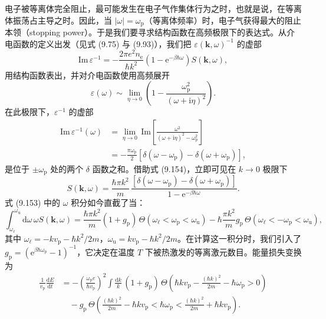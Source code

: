 电子被等离体完全阻止，最可能发生在电子气作集体行为之时，也就是说，在等离体振荡占主导之时。因此，当 $|\omega|=\omega_{\mathrm{p}}$（等离体频率）时，电子气获得最大的阻止本领（stopping power）。于是我们要寻求结构函数在高频极限下的表达式。从介电函数的定义出发（见式 (9.75) 与 (9.93)），我们把 $\varepsilon(\mathbf{k},\omega)^{-1}$ 的虚部
\begin{equation*}
\mathrm{Im}\,\varepsilon^{-1}=-\frac{2\pi e^{2}n_{\mathrm{e}}}{\hbar k^{2}}\left(1-\mathrm{e}^{-\beta\hbar\omega}\right)S(\mathbf{k},\omega),
\tag{9.154}
\end{equation*}
用结构函数表出，并对介电函数使用高频展开
\begin{equation*}
\varepsilon(\omega)\sim\lim_{\eta\to0}\left(1-\frac{\omega_{\mathrm{p}}^{2}}{(\omega+\mathrm{i}\eta)^{2}}\right).
\tag{9.155}
\end{equation*}
在此极限下，$\varepsilon^{-1}$ 的虚部
\begin{align*}
\mathrm{Im}\,\varepsilon^{-1}(\omega)&=\lim_{\eta\to0}\,\mathrm{Im}\left[\frac{\omega^{2}}{(\omega+\mathrm{i}\eta)^{2}-\omega_{\mathrm{p}}^{2}}\right]\\
&=-\frac{\pi\omega_{\mathrm{p}}}{2}\left[\delta(\omega-\omega_{\mathrm{p}})-\delta(\omega+\omega_{\mathrm{p}})\right],
\tag{9.156}
\end{align*}
是位于 $\pm\omega_{\mathrm{p}}$ 处的两个 $\delta$ 函数之和。借助式 (9.154)，立即可见在 $k\to0$ 极限下
\begin{equation*}
S(\mathbf{k},\omega)=\frac{\hbar\pi k^{2}}{m}\,\frac{\left[\delta(\omega-\omega_{\mathrm{p}})-\delta(\omega+\omega_{\mathrm{p}})\right]}{1-\mathrm{e}^{-\beta\hbar\omega}}.
\tag{9.157}
\end{equation*}
式 (9.153) 中的 $\omega$ 积分如今直截了当：
\begin{equation*}
\int_{\omega_{\ell}}^{\omega_{\mathrm{u}}}\mathrm{d}\omega\,\omega S(\mathbf{k},\omega)=\frac{\hbar\pi k^{2}}{m}(1+g_{\mathrm{p}})\,\Theta(\omega_{\ell}<\omega_{\mathrm{p}}<\omega_{\mathrm{u}})-\hbar\frac{\pi k^{2}}{m}g_{\mathrm{p}}\,\Theta(\omega_{\ell}<-\omega_{\mathrm{p}}<\omega_{\mathrm{u}}),
\tag{9.158}
\end{equation*}
其中 $\omega_{\ell}=-kv_{\mathrm{p}}-\hbar k^{2}/2m$，$\omega_{\mathrm{u}}=kv_{\mathrm{p}}-\hbar k^{2}/2m$。在计算这一积分时，我们引入了 $g_{\mathrm{p}}=(\mathrm{e}^{\beta\hbar\omega_{\mathrm{p}}}-1)^{-1}$，它决定在温度 $T$ 下被热激发的等离激元数目。能量损失变换为
\begin{align*}
\frac{1}{v_{\mathrm{p}}}\frac{\mathrm{d}E}{\mathrm{d}t}&=-\left(\frac{\omega_{\mathrm{p}}e}{\hbar v_{\mathrm{p}}}\right)^{2}\int\frac{\mathrm{d}k}{k}\,(1+g_{\mathrm{p}})\,\Theta\left(\hbar kv_{\mathrm{p}}-\frac{(\hbar k)^{2}}{2m}-\hbar\omega_{\mathrm{p}}>0\right)\\
&\quad-g_{\mathrm{p}}\,\Theta\left(\frac{(\hbar k)^{2}}{2m}-\hbar kv_{\mathrm{p}}<\hbar\omega_{\mathrm{p}}<\frac{(\hbar k)^{2}}{2m}+\hbar kv_{\mathrm{p}}\right).
\tag{9.159}
\end{align*}

